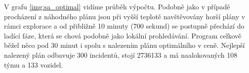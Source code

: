 V grafu \ref{img:sa_optimal} vidíme průběh výpočtu.
Podobně jako v případě procházení z náhodného plánu jsou při vyšší teplotě navštěvovány horší plány v rámci explorace a od přibližně 
10 minuty (700 sekund) se postupně přechází do ladící fáze, která se chová podobně jako lokální prohledávání.
Program celkově běžel něco pod 30 minut i spolu s nalezením plánu optimálního v ceně.
Nejlepší nalezený plán odbavuje 300 incidentů, stojí 2736133 a má naalokovaných 108 týmu a 133 vozidel.


